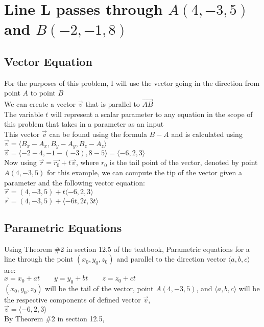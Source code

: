 \documentclass{article}
\begin{document}
\section{Line L passes through $A(4, -3, 5)$ and $B(-2, -1, 8)$}
\subsection*{Vector Equation}
For the purposes of this problem, I will use the vector going in the direction from point $A$ to point $B$
\\We can create a vector $\vec{v}$ that is parallel to $\overrightarrow{AB}$
\\The variable $t$ will represent a scalar parameter to any equation in the scope of this problem that takes in a parameter as an input
\\This vector $\vec{v}$ can be found using the formula $B-A$ and is calculated using $\Vec{v} =\langle B_x-A_x, B_y-A_y, B_z-A_z\rangle$
\\$\vec{v}=\langle-2-4, -1-(-3), 8-5\rangle = \langle-6, 2, 3\rangle$
\\Now using $\vec{r} = \vec{r_0}+t\vec{v}$, where $r_0$ is the tail point of the vector, denoted by point $A(4, -3, 5)$ for this example, we can compute the tip of the vector given a parameter and the following vector equation:
\\[0.1in]$\vec{r} = (4, -3, 5) + t\langle-6,2,3\rangle$
\\[0.1in]$\vec{r} = (4, -3, 5) + \langle-6t,2t,3t\rangle$
\\[0.1in]
\subsection*{Parametric Equations}
Using Theorem \#2 in section 12.5 of the textbook, Parametric equations for a line through the point $(x_0, y_0, z_0)$ and parallel to the direction vector $\langle a,b,c\rangle$ are:
\\[0.05in]$x=x_0+at\qquad y=y_0+bt \qquad z=z_0+ct$
\\[0.05in]$(x_0,y_0,z_0)$ will be the tail of the vector, point $A(4, -3, 5)$, and $\langle a,b,c\rangle$  will be the respective components of defined vector $\vec{v}$, \\$\vec{v} = \langle-6, 2, 3\rangle$
\\[0.05in]By Theorem \#2 in section 12.5, 
\end{document}
